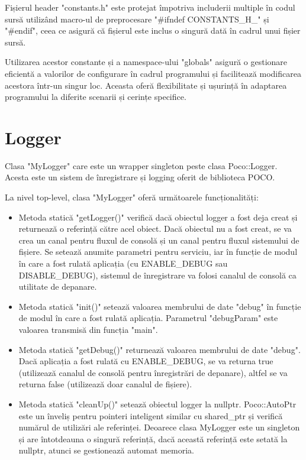 Fișierul header "constants.h" este protejat împotriva includerii multiple în codul sursă utilizând macro-ul de preprocesare "\#ifndef CONSTANTS\_H\_" și "\#endif", ceea ce asigură că fișierul este inclus o singură dată în cadrul unui fișier sursă.

Utilizarea acestor constante și a namespace-ului "globals" asigură o gestionare eficientă a valorilor de configurare în cadrul programului și facilitează modificarea acestora într-un singur loc. Aceasta oferă flexibilitate și ușurință în adaptarea programului la diferite scenarii și cerințe specifice.

\section{Logger}

Clasa "MyLogger" care este un wrapper singleton peste clasa Poco::Logger. Acesta este un sistem de înregistrare și logging oferit de biblioteca POCO. 

La nivel top-level, clasa "MyLogger" oferă următoarele funcționalități:

\begin{itemize}

    \item Metoda statică "getLogger()" verifică dacă obiectul logger a fost deja creat și returnează o referință către acel obiect. Dacă obiectul nu a fost creat, se va crea un canal pentru fluxul de consolă și un canal pentru fluxul sistemului de fișiere. Se setează anumite parametri pentru serviciu, iar în funcție de modul în care a fost rulată aplicația (cu ENABLE\_DEBUG sau DISABLE\_DEBUG), sistemul de înregistrare va folosi canalul de consolă ca utilitate de depanare.

    \item Metoda statică "init()" setează valoarea membrului de date "debug" în funcție de modul în care a fost rulată aplicația. Parametrul "debugParam" este valoarea transmisă din funcția "main".

    \item Metoda statică "getDebug()" returnează valoarea membrului de date "debug". Dacă aplicația a fost rulată cu ENABLE\_DEBUG, se va returna true (utilizează canalul de consolă pentru înregistrări de depanare), altfel se va returna false (utilizează doar canalul de fișiere).

    \item Metoda statică "cleanUp()" setează obiectul logger la nullptr. Poco::AutoPtr este un înveliș pentru pointeri inteligent similar cu shared\_ptr și verifică numărul de utilizări ale referinței. Deoarece clasa MyLogger este un singleton și are întotdeauna o singură referință, dacă această referință este setată la nullptr, atunci se gestionează automat memoria.

\end{itemize}

